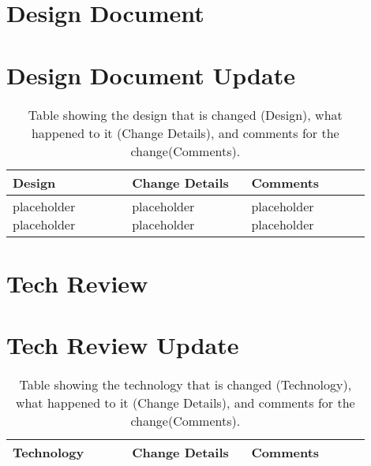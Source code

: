 \documentclass[10pt,journal,compsoc,draftclsnofoot]{IEEEtran}
\begin{document}
\begin{flushleft}
\newpage

\section{Design Document}

\newpage



\section{Design Document Update}

\begin{center}
\begin{table}[H]
\caption{Table showing the design that is changed (Design), what happened to it (Change Details), and comments for the change(Comments).}
\begin{tabular}{ | p{0.3\linewidth} | p{0.3\linewidth} | p{0.3\linewidth} | }
\hline
\textbf{Design}  & \textbf{Change Details}  & \textbf{Comments} \\ \hline

placeholder placeholder & 
placeholder placeholder & 
placeholder placeholder \\ \hline

\end{tabular}
\newline
\label{table:DesignDocumentUpdate}
\end{table}
\end{center}


\newpage

\section{Tech Review}

\newpage



\section{Tech Review Update}

\begin{center}
\begin{table}[H]
\caption{Table showing the technology that is changed (Technology), what happened to it (Change Details), and comments for the change(Comments).}
\begin{tabular}{ | p{0.3\linewidth} | p{0.3\linewidth} | p{0.3\linewidth} | }
\hline
\textbf{Technology}  & \textbf{Change Details}  & \textbf{Comments} \\ \hline


\end{tabular}
\end{table}
\end{center}
\end{flushleft}
\end{document}
